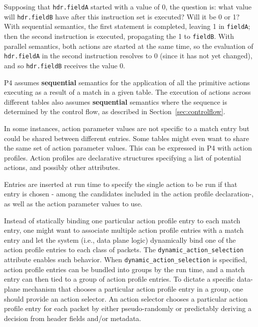 \documentclass[12pt]{article}
\begin{document}
Supposing that \texttt{hdr.fieldA} started with a value of 0, the question is: what 
value will \texttt{hdr.fieldB} have after this instruction set is executed? Will 
it be 0 or 1? With sequential semantics, the first statement is completed, 
leaving 1 in \texttt{fieldA}; then the second instruction is executed, propagating 
the 1 to \texttt{fieldB}.  With parallel semantics, both actions are started at the 
same time, so the evaluation of \texttt{hdr.fieldA} in the second instruction resolves 
to 0 (since it has not yet changed), and so \texttt{hdr.fieldB} receives the value 
0.

P4 assumes \textbf{sequential} semantics for the application of all the primitive actions 
executing as a result of a match in a given table. The execution of actions 
across different tables also assumes \textbf{sequential} semantics where the sequence is 
determined by the control flow, as described in Section~\ref{sec:controlflow}.


In some instances, action parameter values are not specific to a match entry but
could be shared between different entries. Some tables might even want to share
the same set of action parameter values. This can be expressed in P4 with
action profiles.
Action profiles are declarative structures specifying a list of potential
actions, and possibly other attributes.

Entries are inserted at run time to specify the single action to be run if that
entry is chosen - among the candidates included in the action profile
declaration-, as well as the action parameter values to use.

Instead of statically binding one particular action profile entry to each match
entry, one might want to associate multiple action profile entries with a match
entry and let the system (i.e., data plane logic) dynamically bind one of the
action profile entries to each class of packets. The
\texttt{dynamic_action_selection} attribute enables such behavior. When
\texttt{dynamic_action_selection} is specified, action profile entries can be
bundled into groups by the run time, and a match entry can then tied to a group
of action profile entries. To dictate a specific data-plane mechanism that
chooses a particular action profile entry in a group, one should provide an
action selector. An action selector chooses a particular action profile entry
for each packet by either pseudo-randomly or predictably deriving a decision
from header fields and/or metadata.
\end{document}
